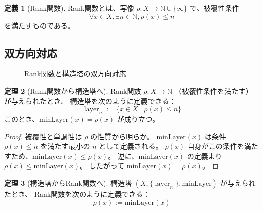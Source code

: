 \documentclass[a4paper,12pt]{ltjsarticle}
\theoremstyle{definition}
\newtheorem{definition}{定義}[section]
\newtheorem{theorem}[definition]{定理}
\newcommand{\N}{\mathbb{N}}
\newcommand{\minLayer}{\mathrm{minLayer}}
\DeclareMathOperator{\layer}{layer}
\begin{document}
\begin{definition}[Rank関数]
Rank関数とは、写像 $\rho : X \to \N \cup \{\infty\}$ で、被覆性条件
\[
\forall x \in X, \exists n \in \N, \rho(x) \leq n
\]
を満たすものである。
\end{definition}

\subsection{双方向対応}

\begin{figure}[h]
\centering
{}
\caption{Rank関数と構造塔の双方向対応}
\label{fig:rank-tower-bijection}
\end{figure}

\begin{theorem}[Rank関数から構造塔へ]
\label{thm:rank-to-tower}
Rank関数 $\rho : X \to \N$ （被覆性条件を満たす）が与えられたとき、
構造塔を次のように定義できる：
\[
\layer_n := \{x \in X \mid \rho(x) \leq n\}
\]
このとき、$\minLayer(x) = \rho(x)$ が成り立つ。
\end{theorem}

\begin{proof}
被覆性と単調性は $\rho$ の性質から明らか。
$\minLayer(x)$ は条件 $\rho(x) \leq n$ を満たす最小の $n$ として定義される。
$\rho(x)$ 自身がこの条件を満たすため、$\minLayer(x) \leq \rho(x)$。
逆に、$\minLayer(x)$ の定義より $\rho(x) \leq \minLayer(x)$。
したがって $\minLayer(x) = \rho(x)$。
\end{proof}

\begin{theorem}[構造塔からRank関数へ]
\label{thm:tower-to-rank}
構造塔 $(X, \{\layer_n\}, \minLayer)$ が与えられたとき、
Rank関数を次のように定義できる：
\[
\rho(x) := \minLayer(x)
\]
\end{theorem}
\end{document}
